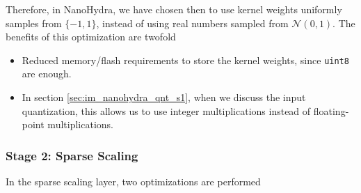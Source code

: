         Therefore, in NanoHydra, we have chosen then to use kernel weights uniformly samples from $\{-1,1\}$, instead of using real numbers sampled from $\mathcal{N}(0,1)$. The benefits of this optimization are twofold

        \begin{itemize}
            \item Reduced memory/flash requirements to store the kernel weights, since \verb|uint8| are enough.
            \item In section \ref{sec:im_nanohydra_qnt_s1}, when we discuss the input quantization, this allows us to use integer multiplications instead of floating-point multiplications.
        \end{itemize}

        \subsubsection{Stage 2: Sparse Scaling}\label{sec:im_nanohydra_algopt_s2}

        In the sparse scaling layer, two optimizations are performed

